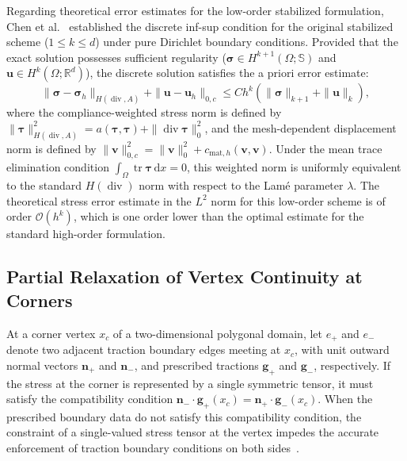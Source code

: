 Regarding theoretical error estimates for the low-order stabilized formulation, Chen et al.~\cite{Chen2017} established the discrete inf-sup condition for the original stabilized scheme ($1 \le k \le d$) under pure Dirichlet boundary conditions. Provided that the exact solution possesses sufficient regularity ($\boldsymbol{\sigma} \in H^{k+1}(\Omega;\mathbb{S})$ and $\boldsymbol{u} \in H^k(\Omega;\mathbb{R}^d)$), the discrete solution satisfies the a priori error estimate:
\begin{equation}
\label{eq:stabilized_error_estimate}
\|\boldsymbol{\sigma} - \boldsymbol{\sigma}_h\|_{H(\operatorname{div},A)} + \|\boldsymbol{u} - \boldsymbol{u}_h\|_{0,c} \le C h^k \left( \|\boldsymbol{\sigma}\|_{k+1} + \|\boldsymbol{u}\|_k \right),
\end{equation}
where the compliance-weighted stress norm is defined by $\|\boldsymbol{\tau}\|_{H(\operatorname{div},A)}^2 = a(\boldsymbol{\tau},\boldsymbol{\tau}) + \|\operatorname{div}\boldsymbol{\tau}\|_0^2$, and the mesh-dependent displacement norm is defined by $\|\boldsymbol{v}\|_{0,c}^2 = \|\boldsymbol{v}\|_0^2 + c_{\mathrm{mat},h}(\boldsymbol{v},\boldsymbol{v})$. Under the mean trace elimination condition $\int_\Omega \operatorname{tr}\boldsymbol{\tau}\,\mathrm{d}x = 0$, this weighted norm is uniformly equivalent to the standard $H(\operatorname{div})$ norm with respect to the Lam\'e parameter $\lambda$. The theoretical stress error estimate in the $L^2$ norm for this low-order scheme is of order $\mathcal{O}(h^k)$, which is one order lower than the optimal estimate for the standard high-order formulation.



\subsection{Partial Relaxation of Vertex Continuity at Corners}
\label{subsec:corner_relaxation}

At a corner vertex $x_c$ of a two-dimensional polygonal domain, let $e_+$ and $e_-$ denote two adjacent traction boundary edges meeting at $x_c$, with unit outward normal vectors $\boldsymbol{n}_+$ and $\boldsymbol{n}_-$, and prescribed tractions $\boldsymbol{g}_+$ and $\boldsymbol{g}_-$, respectively. If the stress at the corner is represented by a single symmetric tensor, it must satisfy the compatibility condition $\boldsymbol{n}_- \cdot \boldsymbol{g}_+(x_c) = \boldsymbol{n}_+ \cdot \boldsymbol{g}_-(x_c)$. When the prescribed boundary data do not satisfy this compatibility condition, the constraint of a single-valued stress tensor at the vertex impedes the accurate enforcement of traction boundary conditions on both sides~\cite{HuMa2021}.

